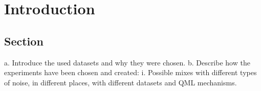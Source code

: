 \chapter{Introduction}\label{chapter:introduction}

\section{Section}
a.	Introduce the used datasets and why they were chosen.
b.	Describe how the experiments have been chosen and created:
    i.	Possible mixes with different types of noise, in different places, with different datasets and QML mechanisms.
